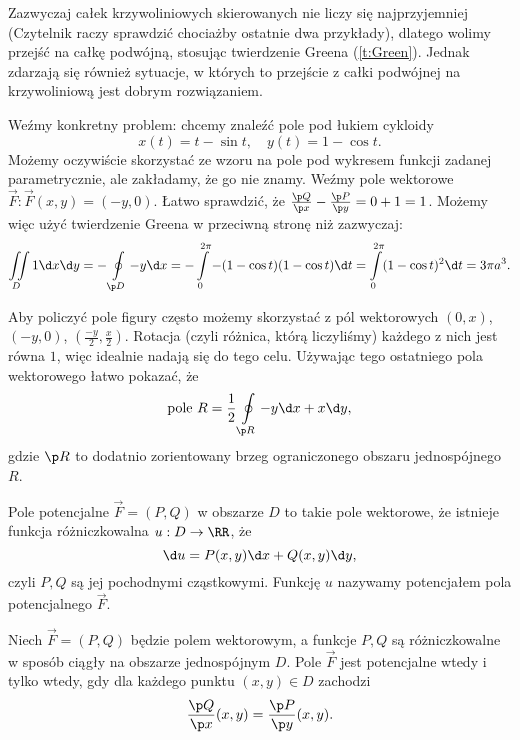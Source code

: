 \begin{remark}
    Zazwyczaj całek krzywoliniowych skierowanych nie liczy się najprzyjemniej (Czytelnik raczy sprawdzić chociażby ostatnie dwa przykłady), dlatego wolimy przejść na całkę podwójną, stosując twierdzenie Greena (\ref{t:Green}). Jednak zdarzają się również sytuacje, w których to przejście z całki podwójnej na krzywoliniową jest dobrym rozwiązaniem.

    Weźmy konkretny problem: chcemy znaleźć pole pod łukiem cykloidy
    \[ x(t) = t - \sin t, \quad y(t) = 1 - \cos t. \]
    Możemy oczywiście skorzystać ze wzoru na pole pod wykresem funkcji zadanej parametrycznie, ale zakładamy, że go nie znamy. Weźmy pole wektorowe $\vec{F} : \vec{F}(x, y) = (-y, 0)$. Łatwo sprawdzić, że $\frac{\p Q}{\p x} - \frac{\p P}{\p y} = 0 + 1 = 1$. Możemy więc użyć twierdzenie Greena w przeciwną stronę niż zazwyczaj:
    \[ \iint\limits_D 1 \d x \d y = -\oint\limits_{\p D} -y \d x = -\int\limits_0^{2\pi} -(1 - \cos t)(1 - \cos t) \d t = \int\limits_0^{2\pi} (1 - \cos t)^2 \d t = 3\pi a^3.\]

    Aby policzyć pole figury często możemy skorzystać z pól wektorowych $(0, x)$, $(-y, 0)$, $\left(\frac{-y}{2}, \frac{x}{2}\right)$. Rotacja (czyli różnica, którą liczyliśmy) każdego z nich jest równa $1$, więc idealnie nadają się do tego celu. Używając tego ostatniego pola wektorowego łatwo pokazać, że
    \begin{equation}
        \text{pole } R = \frac{1}{2}\oint\limits_{\p R} -y \d x + x \d y,
    \end{equation}
    gdzie $\p R$ to dodatnio zorientowany brzeg ograniczonego obszaru jednospójnego $R$.
\end{remark}

\begin{definition}
    Pole potencjalne $\vec{F} = (P, Q)$ w obszarze $D$ to takie pole wektorowe, że istnieje funkcja różniczkowalna $u : D \to \RR$, że
    \[ \d u = P(x, y) \d x + Q(x, y) \d y, \]
    czyli $P, Q$ są jej pochodnymi cząstkowymi. Funkcję $u$ nazywamy potencjałem pola potencjalnego $\vec{F}$.
\end{definition}

\begin{theorem}
    \label{t:necessary and sufficient condition for field potentiality}
    Niech $\vec{F} = (P, Q)$ będzie polem wektorowym, a funkcje $P, Q$ są różniczkowalne w sposób ciągły na obszarze jednospójnym $D$. Pole $\vec{F}$ jest potencjalne wtedy i tylko wtedy, gdy dla każdego punktu $(x, y) \in D$ zachodzi
    \[ \frac{\p Q}{\p x}(x, y) = \frac{\p P}{\p y}(x, y). \]
\end{theorem}

